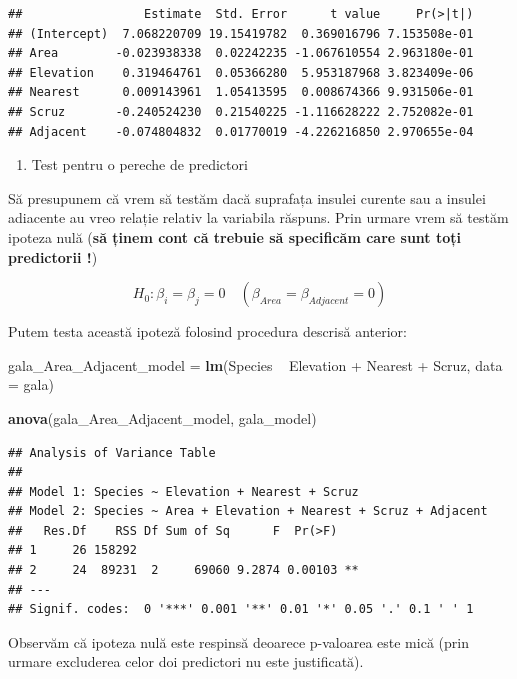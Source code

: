 \documentclass[]{article}
\newenvironment{Shaded}{\begin{snugshade}}{\end{snugshade}}
\newcommand{\KeywordTok}[1]{\textcolor[rgb]{0.13,0.29,0.53}{\textbf{{#1}}}}
\newcommand{\DataTypeTok}[1]{\textcolor[rgb]{0.13,0.29,0.53}{{#1}}}
\newcommand{\StringTok}[1]{\textcolor[rgb]{0.31,0.60,0.02}{{#1}}}
\newcommand{\NormalTok}[1]{{#1}}
\providecommand{\tightlist}{%
  \setlength{\itemsep}{0pt}\setlength{\parskip}{0pt}}
\begin{document}
\begin{verbatim}
##                 Estimate  Std. Error      t value     Pr(>|t|)
## (Intercept)  7.068220709 19.15419782  0.369016796 7.153508e-01
## Area        -0.023938338  0.02242235 -1.067610554 2.963180e-01
## Elevation    0.319464761  0.05366280  5.953187968 3.823409e-06
## Nearest      0.009143961  1.05413595  0.008674366 9.931506e-01
## Scruz       -0.240524230  0.21540225 -1.116628222 2.752082e-01
## Adjacent    -0.074804832  0.01770019 -4.226216850 2.970655e-04
\end{verbatim}

\begin{enumerate}
\def\labelenumi{\alph{enumi})}
\setcounter{enumi}{2}
\tightlist
\item
  Test pentru o pereche de predictori
\end{enumerate}

Să presupunem că vrem să testăm dacă suprafața insulei curente sau a
insulei adiacente au vreo relație relativ la variabila răspuns. Prin
urmare vrem să testăm ipoteza nulă (\textbf{să ținem cont că trebuie să
specificăm care sunt toți predictorii !})

\[
H_0:\beta_i=\beta_j=0\quad(\beta_{Area}=\beta_{Adjacent}=0)
\]

Putem testa această ipoteză folosind procedura descrisă anterior:

\begin{Shaded}
\begin{Highlighting}[]
\NormalTok{gala_Area_Adjacent_model =}\StringTok{ }\KeywordTok{lm}\NormalTok{(Species ~}\StringTok{ }\NormalTok{Elevation +}\StringTok{ }\NormalTok{Nearest +}\StringTok{ }\NormalTok{Scruz, }
    \DataTypeTok{data =} \NormalTok{gala)}

\KeywordTok{anova}\NormalTok{(gala_Area_Adjacent_model, gala_model)}
\end{Highlighting}
\end{Shaded}

\begin{verbatim}
## Analysis of Variance Table
## 
## Model 1: Species ~ Elevation + Nearest + Scruz
## Model 2: Species ~ Area + Elevation + Nearest + Scruz + Adjacent
##   Res.Df    RSS Df Sum of Sq      F  Pr(>F)   
## 1     26 158292                               
## 2     24  89231  2     69060 9.2874 0.00103 **
## ---
## Signif. codes:  0 '***' 0.001 '**' 0.01 '*' 0.05 '.' 0.1 ' ' 1
\end{verbatim}

Observăm că ipoteza nulă este respinsă deoarece p-valoarea este mică
(prin urmare excluderea celor doi predictori nu este justificată).
\end{document}
